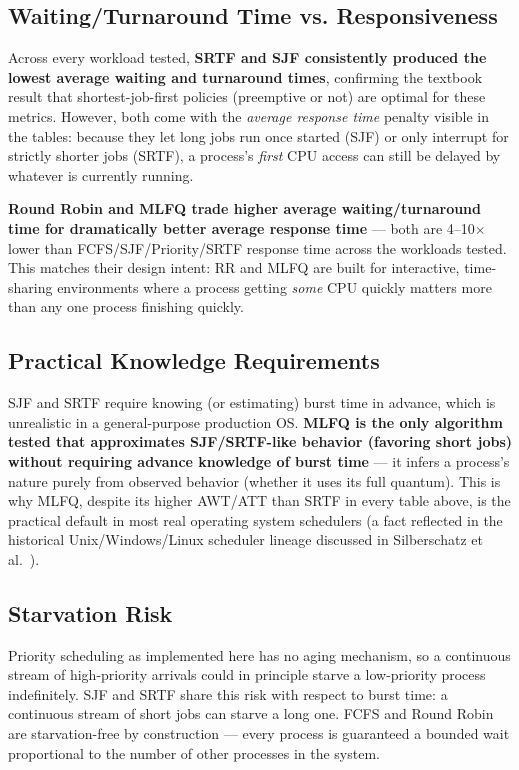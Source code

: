 \documentclass[11pt]{article}
\begin{document}
\subsection{Waiting/Turnaround Time vs. Responsiveness}

Across every workload tested, \textbf{SRTF and SJF consistently produced
the lowest average waiting and turnaround times}, confirming the textbook
result that shortest-job-first policies (preemptive or not) are optimal
for these metrics. However, both come with the \emph{average response
time} penalty visible in the tables: because they let long jobs run once
started (SJF) or only interrupt for strictly shorter jobs (SRTF), a
process's \emph{first} CPU access can still be delayed by whatever is
currently running.

\textbf{Round Robin and MLFQ trade higher average waiting/turnaround time
for dramatically better average response time} --- both are 4--10$\times$
lower than FCFS/SJF/Priority/SRTF response time across the workloads
tested. This matches their design intent: RR and MLFQ are built for
interactive, time-sharing environments where a process getting \emph{some}
CPU quickly matters more than any one process finishing quickly.

\subsection{Practical Knowledge Requirements}

SJF and SRTF require knowing (or estimating) burst time in advance, which
is unrealistic in a general-purpose production OS. \textbf{MLFQ is the
only algorithm tested that approximates SJF/SRTF-like behavior
(favoring short jobs) without requiring advance knowledge of burst
time} --- it infers a process's nature purely from observed behavior
(whether it uses its full quantum). This is why MLFQ, despite its higher
AWT/ATT than SRTF in every table above, is the practical default in most
real operating system schedulers (a fact reflected in the historical
Unix/Windows/Linux scheduler lineage discussed in
Silberschatz et al.~\cite{silberschatz2018}).

\subsection{Starvation Risk}

Priority scheduling as implemented here has no aging mechanism, so a
continuous stream of high-priority arrivals could in principle starve a
low-priority process indefinitely. SJF and SRTF share this risk with
respect to burst time: a continuous stream of short jobs can starve a long
one. FCFS and Round Robin are starvation-free by construction --- every
process is guaranteed a bounded wait proportional to the number of other
processes in the system.
\end{document}
